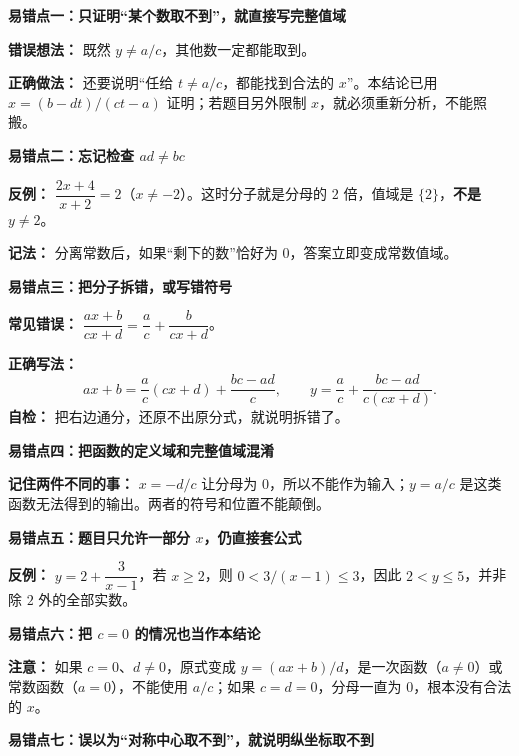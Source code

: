 \clearpage
\begin{trapbox}
    \textbf{\textcolor{CTrap}{易错点一：只证明“某个数取不到”，就直接写完整值域}}

    \textbf{错误想法：} 既然 $y\ne a/c$，其他数一定都能取到。

    \textbf{正确做法：} 还要说明“任给 $t\ne a/c$，都能找到合法的 $x$”。本结论已用 $x=(b-dt)/(ct-a)$ 证明；若题目另外限制 $x$，就必须重新分析，不能照搬。

    \medskip
    \begin{minipage}{\linewidth}
\textbf{\textcolor{CTrap}{易错点二：忘记检查 $ad\ne bc$}}
\begin{center}\end{center}
\end{minipage}



    \textbf{反例：} $\dfrac{2x+4}{x+2}=2$（$x\ne-2$）。这时分子就是分母的 $2$ 倍，值域是 $\{2\}$，\textbf{不是} $y\ne2$。

    \textbf{记法：} 分离常数后，如果“剩下的数”恰好为 $0$，答案立即变成常数值域。

    \medskip
    \textbf{\textcolor{CTrap}{易错点三：把分子拆错，或写错符号}}

    \textbf{常见错误：} $\dfrac{ax+b}{cx+d}=\dfrac ac+\dfrac{b}{cx+d}$。

    \textbf{正确写法：}
    \[
        ax+b=\frac ac(cx+d)+\frac{bc-ad}{c},\qquad
        y=\frac ac+\frac{bc-ad}{c(cx+d)}.
    \]
    \textbf{自检：} 把右边通分，还原不出原分式，就说明拆错了。

    \medskip
    \textbf{\textcolor{CTrap}{易错点四：把函数的定义域和完整值域混淆}}

    \textbf{记住两件不同的事：} $x=-d/c$ 让分母为 $0$，所以不能作为输入；$y=a/c$ 是这类函数无法得到的输出。两者的符号和位置不能颠倒。

    \medskip
    \textbf{\textcolor{CTrap}{易错点五：题目只允许一部分 $x$，仍直接套公式}}

    \textbf{反例：} $y=2+\dfrac3{x-1}$，若 $x\ge2$，则 $0<3/(x-1)\le3$，因此 $2<y\le5$，并非除 $2$ 外的全部实数。

    \medskip
    \textbf{\textcolor{CTrap}{易错点六：把 $c=0$ 的情况也当作本结论}}

    \textbf{注意：} 如果 $c=0$、$d\ne0$，原式变成 $y=(ax+b)/d$，是一次函数（$a\ne0$）或常数函数（$a=0$），不能使用 $a/c$；如果 $c=d=0$，分母一直为 $0$，根本没有合法的 $x$。


    \medskip
    \textbf{\textcolor{CTrap}{易错点七：误以为“对称中心取不到”，就说明纵坐标取不到}}


\end{trapbox}
